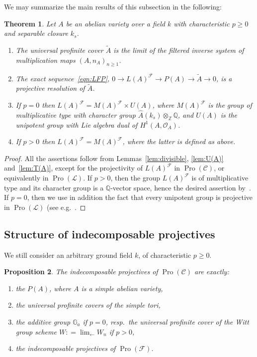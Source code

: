 \documentclass[11pt]{article}
\newtheorem{theo}{Theorem}[section]
\newtheorem{prop}[theo]{Proposition}
\theoremstyle{definition}
\numberwithin{equation}{section}
\newcommand\bG{{\mathbb G}}
\newcommand\bQ{{\mathbb Q}}
\newcommand\bZ{{\mathbb Z}}
\newcommand\cC{{\mathcal C}}
\newcommand\cF{{\mathcal F}}
\newcommand\cL{{\mathcal L}}
\newcommand\cO{{\mathcal O}}
\newcommand\tA{{\widetilde A}}
\newcommand\wA{\widehat{A}}
\DeclareMathOperator{\Pro}{Pro}
\theoremstyle{remark}
\newcommand*{\romanenumi}{}%
\begin{document}
We may summarize the main results of this subsection in the following:

\begin{theo}\label{thm:P(A)}
Let $A$ be an abelian variety over a field $k$ with characteristic $p \geq 0$ and separable closure $k_s$.
\begin{enumerate}\romanenumi
\item \label{3.10.1} The universal profinite cover $\tA$ is the limit of the filtered inverse system of multiplication maps $(A,n_A)_{n \geq 1}$.
\item \label{3.10.2} The exact sequence~\eqref{eqn:LFP}, $0 \to L(A)^{\cF} \to P(A) \to \tA \to 0$, is a projective resolution of $\tA$.
\item \label{3.10.3} If $p = 0$ then $L(A)^{\cF} = M(A)^{\cF} \times U(A)$, where $M(A)^{\cF}$ is the group of multiplicative type with character group $\wA(k_s) \otimes_{\bZ} \bQ$, and $U(A)$ is the unipotent group with Lie algebra dual of $H^1(A,\cO_A)$.
\item \label{3.10.4} If $p > 0$ then $L(A)^{\cF} = M(A)^{\cF}$, where the latter is defined as above.
\end{enumerate}
\end{theo}

\begin{proof}
All the assertions follow from Lemmas~\ref{lem:divisible}, \ref{lem:U(A)} and~\ref{lem:T(A)}, except for the projectivity of $L(A)^{\cF}$ in $\Pro(\cC)$, or equivalently in $\Pro(\cL)$. If $p > 0$, then the group $L(A)^{\cF}$ is of multiplicative type and its character group is a $\bQ$-vector space, hence the desired assertion by~\cite[V.3.5.2]{DG}. If $p = 0$, then we use in addition the fact that every unipotent group is projective in $\Pro(\cL)$ (see e.g.~\cite[V.3.6.5]{DG}.
\end{proof}

\subsection{Structure of indecomposable projectives}\label{subsec:indproj}

We still consider an arbitrary ground field $k$, of characteristic $p \geq 0$.

\begin{prop}\label{prop:projind}
The indecomposable projectives of $\Pro(\cC)$ are exactly:
\begin{enumerate}\romanenumi
\item \label{3.11.1} the $P(A)$, where $A$ is a simple abelian variety,
\item \label{3.11.2} the universal profinite covers of the simple tori,
\item \label{3.11.3} the additive group $\bG_a$ if $p = 0$, resp.~the universal profinite cover of the Witt group scheme $W : = \lim_{\leftarrow} W_n$ if $p > 0$,
\item \label{3.11.4} the indecomposable projectives of $\Pro(\cF)$.
\end{enumerate}
\end{prop}
\end{document}
